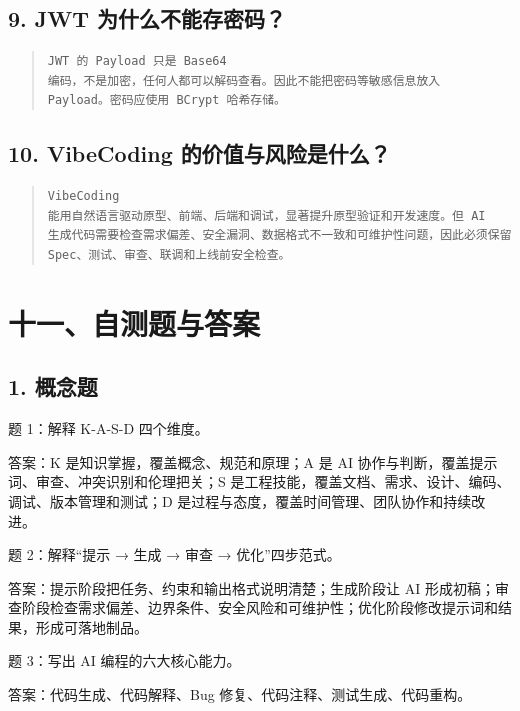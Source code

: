 \documentclass[UTF8,zihao=-4]{ctexart}
\begin{document}
\subsection{9. JWT 为什么不能存密码？}

\begin{quote}
\footnotesize
\begin{verbatim}
JWT 的 Payload 只是 Base64 
编码，不是加密，任何人都可以解码查看。因此不能把密码等敏感信息放入 
Payload。密码应使用 BCrypt 哈希存储。
\end{verbatim}
\end{quote}

\subsection{10. VibeCoding 的价值与风险是什么？}

\begin{quote}
\footnotesize
\begin{verbatim}
VibeCoding 
能用自然语言驱动原型、前端、后端和调试，显著提升原型验证和开发速度。但 AI 
生成代码需要检查需求偏差、安全漏洞、数据格式不一致和可维护性问题，因此必须保留 
Spec、测试、审查、联调和上线前安全检查。
\end{verbatim}
\end{quote}

\section{十一、自测题与答案}

\subsection{1. 概念题}

题 1：解释 K-A-S-D 四个维度。

答案：K 是知识掌握，覆盖概念、规范和原理；A 是 AI 协作与判断，覆盖提示词、审查、冲突识别和伦理把关；S 是工程技能，覆盖文档、需求、设计、编码、调试、版本管理和测试；D 是过程与态度，覆盖时间管理、团队协作和持续改进。

题 2：解释“提示 → 生成 → 审查 → 优化”四步范式。

答案：提示阶段把任务、约束和输出格式说明清楚；生成阶段让 AI 形成初稿；审查阶段检查需求偏差、边界条件、安全风险和可维护性；优化阶段修改提示词和结果，形成可落地制品。

题 3：写出 AI 编程的六大核心能力。

答案：代码生成、代码解释、Bug 修复、代码注释、测试生成、代码重构。
\end{document}

